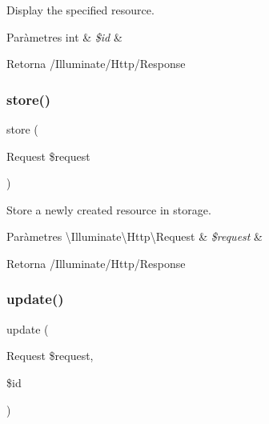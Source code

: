 Display the specified resource.


\begin{DoxyParams}[1]{Paràmetres}
int & {\em \$id} & \\
\hline
\end{DoxyParams}
\begin{DoxyReturn}{Retorna}
/\+Illuminate/\+Http/\+Response 
\end{DoxyReturn}
\mbox{\label{class_app_1_1_http_1_1_controllers_1_1_ventes_controller_a9ef485163104597c12185b53cdacf638}} 
\subsubsection{\texorpdfstring{store()}{store()}}
{\footnotesize\ttfamily store (\begin{DoxyParamCaption}\item[{Request}]{\$request }\end{DoxyParamCaption})}

Store a newly created resource in storage.


\begin{DoxyParams}[1]{Paràmetres}
\textbackslash{}\+Illuminate\textbackslash{}\+Http\textbackslash{}\+Request & {\em \$request} & \\
\hline
\end{DoxyParams}
\begin{DoxyReturn}{Retorna}
/\+Illuminate/\+Http/\+Response 
\end{DoxyReturn}
\mbox{\label{class_app_1_1_http_1_1_controllers_1_1_ventes_controller_affb03cc19897a1800a0f411264d6c7cc}} 
\subsubsection{\texorpdfstring{update()}{update()}}
{\footnotesize\ttfamily update (\begin{DoxyParamCaption}\item[{Request}]{\$request,  }\item[{}]{\$id }\end{DoxyParamCaption})}

